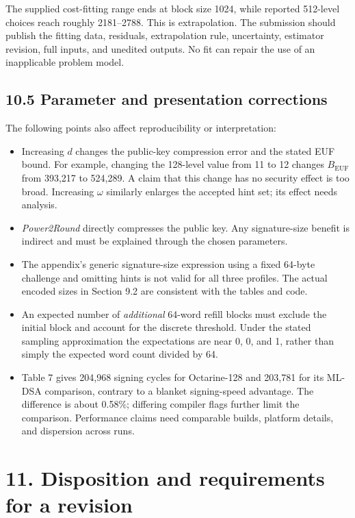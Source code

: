\documentclass[
  american,
  10pt,
  a4paper,
]{article}
\providecommand{\tightlist}{%
  \setlength{\itemsep}{0pt}\setlength{\parskip}{0pt}}
\begin{document}
The supplied cost-fitting range ends at block size 1024, while reported
512-level choices reach roughly 2181--2788. This is extrapolation. The
submission should publish the fitting data, residuals, extrapolation
rule, uncertainty, estimator revision, full inputs, and unedited
outputs. No fit can repair the use of an inapplicable problem model.

\subsection{10.5 Parameter and presentation
corrections}\label{parameter-and-presentation-corrections}

The following points also affect reproducibility or interpretation:

\begin{itemize}
\tightlist
\item
  Increasing \(d\) changes the public-key compression error and the
  stated EUF bound. For example, changing the 128-level value from 11 to
  12 changes \(B_{\mathrm{EUF}}\) from 393,217 to 524,289. A claim that
  this change has no security effect is too broad. Increasing \(\omega\)
  similarly enlarges the accepted hint set; its effect needs analysis.
\item
  \emph{Power2Round} directly compresses the public key. Any
  signature-size benefit is indirect and must be explained through the
  chosen parameters.
\item
  The appendix's generic signature-size expression using a fixed 64-byte
  challenge and omitting hints is not valid for all three profiles. The
  actual encoded sizes in Section 9.2 are consistent with the tables and
  code.
\item
  An expected number of \emph{additional} 64-word refill blocks must
  exclude the initial block and account for the discrete threshold.
  Under the stated sampling approximation the expectations are near 0,
  0, and 1, rather than simply the expected word count divided by 64.
\item
  Table 7 gives 204,968 signing cycles for Octarine-128 and 203,781 for
  its ML-DSA comparison, contrary to a blanket signing-speed advantage.
  The difference is about 0.58\%; differing compiler flags further limit
  the comparison. Performance claims need comparable builds, platform
  details, and dispersion across runs.
\end{itemize}

\section{11. Disposition and requirements for a
revision}\label{disposition-and-requirements-for-a-revision}
\end{document}
